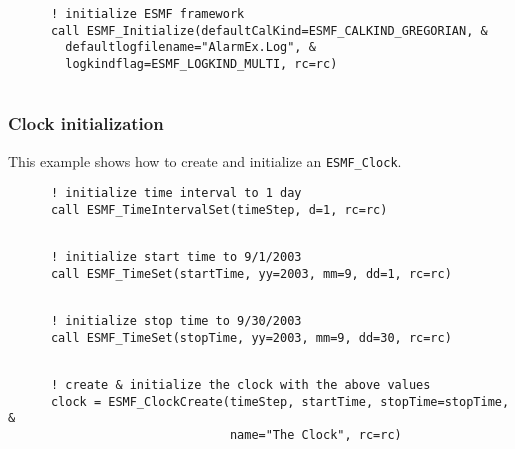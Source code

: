 
 \begin{verbatim}
      ! initialize ESMF framework
      call ESMF_Initialize(defaultCalKind=ESMF_CALKIND_GREGORIAN, &
        defaultlogfilename="AlarmEx.Log", &
        logkindflag=ESMF_LOGKIND_MULTI, rc=rc)
 
\end{verbatim}
 

  \subsubsection{Clock initialization}
 
   This example shows how to create and initialize an {\tt ESMF\_Clock}. 

 \begin{verbatim}
      ! initialize time interval to 1 day
      call ESMF_TimeIntervalSet(timeStep, d=1, rc=rc)
 
\end{verbatim}
 

 \begin{verbatim}
      ! initialize start time to 9/1/2003
      call ESMF_TimeSet(startTime, yy=2003, mm=9, dd=1, rc=rc)
 
\end{verbatim}
 

 \begin{verbatim}
      ! initialize stop time to 9/30/2003
      call ESMF_TimeSet(stopTime, yy=2003, mm=9, dd=30, rc=rc)
 
\end{verbatim}
 

 \begin{verbatim}
      ! create & initialize the clock with the above values
      clock = ESMF_ClockCreate(timeStep, startTime, stopTime=stopTime, &
                               name="The Clock", rc=rc)
 
\end{verbatim}
 

